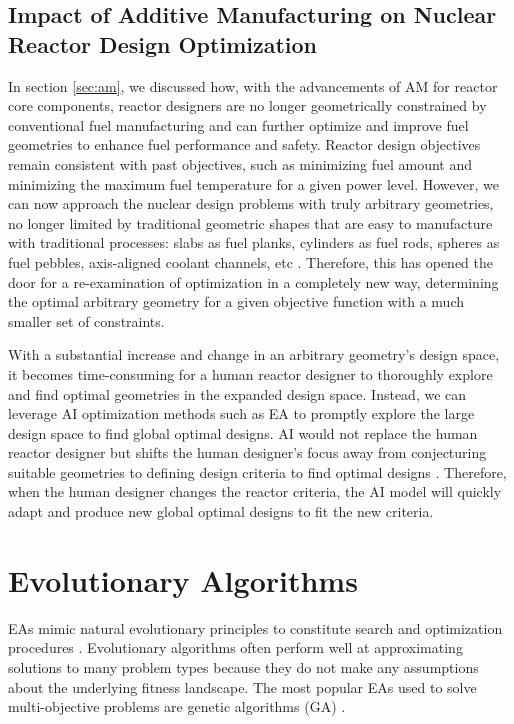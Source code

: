 \subsection{Impact of Additive Manufacturing on Nuclear Reactor Design 
Optimization}
In section \ref{sec:am}, we discussed how, with the advancements of \gls{AM} 
for reactor core components, reactor designers are no longer geometrically 
constrained by conventional fuel manufacturing and can further optimize and 
improve fuel geometries to enhance fuel performance and safety. 
Reactor design objectives remain consistent with past objectives, such as 
minimizing fuel amount and minimizing the maximum fuel temperature for a given 
power level.
However, we can now approach the nuclear design problems with truly arbitrary 
geometries, no longer limited by traditional geometric shapes that are 
easy to manufacture with traditional processes: slabs as fuel planks, cylinders 
as fuel rods, spheres as fuel pebbles, axis-aligned coolant channels, etc  
\cite{sobes_artificial_2020}.
Therefore, this has opened the door for a re-examination of optimization in a 
completely new way, determining the optimal arbitrary geometry for a given objective 
function \cite{sobes_artificial_2020} with a much smaller set of constraints. 

With a substantial increase and change in an arbitrary geometry's design space, 
it becomes time-consuming for a human reactor designer to thoroughly explore 
and find optimal geometries in the expanded design space. 
Instead, we can leverage \gls{AI} optimization methods such as \gls{EA} to 
promptly explore the large design space to find global optimal designs. 
\gls{AI} would not replace the human reactor designer but shifts the human 
designer's focus away from conjecturing suitable geometries to defining design 
criteria to find optimal designs \cite{sobes_artificial_2020}. 
Therefore, when the human designer changes the reactor criteria, the \gls{AI} 
model will quickly adapt and produce new global optimal designs to fit the new 
criteria.  

\section{Evolutionary Algorithms} 
\glspl{EA} mimic natural evolutionary principles to constitute search and 
optimization procedures \cite{deb_multi-objective_2001}. 
Evolutionary algorithms often perform well at approximating solutions to many 
problem types because they do not make any assumptions about the 
underlying fitness landscape.
The most popular \glspl{EA} used to solve multi-objective problems are genetic 
algorithms (GA) \cite{byrne_evolving_2014, krish_practical_2011}. 

